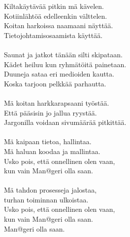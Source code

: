 
Kiltakäytävää pitkin mä kävelen. \\ Kotiinlähtöä edelleenkin välttelen. \\ Koitan harkoissa naamaani näyttää. \\ Tietojohtamisosaamista käyttää. \\ \hspace{10mm} \\ Saunat ja jatkot tänään silti skipataan. \\ Kädet heiluu kun ryhmätöitä painetaan. \\ Duuneja sataa eri medioiden kautta. \\ Koska tarjoon pelkkää parhautta. \\ \hspace{10mm} \\ Mä koitan harkkarapsaani työstää. \\ Että pääsisin jo jallua ryystää. \\ Jargonilla voidaan sivumäärää pitkittää. \\ \hspace{10mm} \\ Mä kaipaan tietoa, hallintaa. \\ Mä haluan koodaa ja mallintaa. \\ Usko pois, että onnellinen olen vaan, \\ kun vain Man@geri olla saan. \\ \hspace{10mm} \\ Mä tahdon prosesseja jalostaa, \\ turhan toiminnan ulkoistaa. \\ Usko pois, että onnellinen olen vaan, \\ kun vain Man@geri olla saan. \\ Man@geri olla saan.